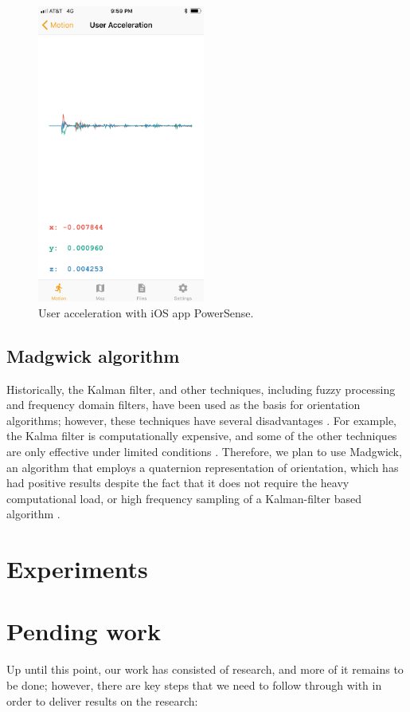 \documentclass[journal]{IEEEtranTIE}
\begin{document}
\begin{figure}[!t]\centering
	\includegraphics[width=5.5cm]{acceleration}
	\caption{User acceleration with iOS app PowerSense.}\label{fig:fig2}
\end{figure}

\subsection{Madgwick algorithm}

Historically, the Kalman filter, and other techniques, including fuzzy
processing and frequency domain filters, have been used as the basis for
orientation algorithms; however, these techniques have several disadvantages
\cite{Madgwick}. For example, the Kalma filter is computationally expensive,
and some of the other techniques are only effective under limited conditions
\cite{Madgwick}. Therefore, we plan to use Madgwick, an algorithm that employs a
quaternion representation of orientation, which has had positive results despite
the fact that it does not require the heavy computational load, or high
frequency sampling of a Kalman-filter based algorithm \cite{Madgwick}.

\section{Experiments}

\section{Pending work}

Up until this point, our work has consisted of research, and more of it
remains to be done; however, there are key steps that we need to follow through
with in order to deliver results on the research:
\end{document}
